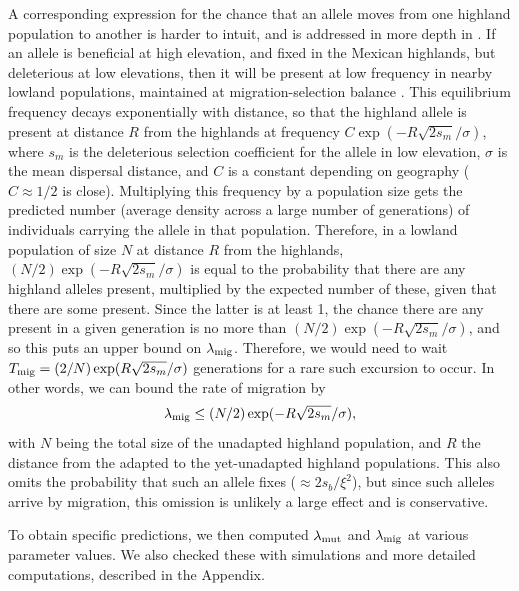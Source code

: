 A corresponding expression for the chance that an allele moves from one highland population to another is harder to intuit,
and is addressed in more depth in \citep{ralphcoop2013patches}.
If an allele is beneficial at high elevation, and fixed in the Mexican highlands,
but deleterious at low elevations,
then it will be present at low frequency in nearby lowland populations,
maintained at migration-selection balance \citep{slatkin1973geneflow}.
This equilibrium frequency decays exponentially with distance,
so that the highland allele is present at distance $R$ from the highlands at frequency $C \exp(- R \sqrt{2s_m} / \sigma)$,
where $s_m$ is the deleterious selection coefficient for the allele in low elevation,
$\sigma$ is the mean dispersal distance,
and $C$ is a constant depending on geography ($C\approx 1/2$ is close).
Multiplying this frequency by a population size gets the predicted number (average density across a large number of generations) of individuals carrying the allele in that population.
Therefore, in a lowland population of size $N$ at distance $R$ from the highlands,
$(N/2)  \exp(- R \sqrt{2s_m} / \sigma)$ is equal to the probability that there are any highland alleles present,
multiplied by the expected number of these, given that there are some present.
Since the latter is at least 1,
the chance there are any present in a given generation is no more than $(N/2) \exp(- R \sqrt{2s_m} / \sigma)$,
and so this puts an upper bound on $\lambda_{\text{mig}}$.
Therefore, we would need to wait $T_{\text{mig}} = (2/N)\exp(R \sqrt{2s_m} / \sigma)$ generations 
for a rare such excursion to occur.
In other words, we can bound the rate of migration by
\begin{align}
  \lambda_{\text{mig}} \le (N/2)  \exp(- R \sqrt{2s_m} / \sigma) ,
\end{align}
with $N$ being the total size of the unadapted highland population,
and $R$ the distance from the adapted to the yet-unadapted highland populations.
This also omits the probability that such an allele fixes ($\approx 2s_b/\xi^2$), 
but since such alleles arrive by migration, this omission is unlikely a large effect and is conservative.

To obtain specific predictions,
we then computed $\lambda_{\text{mut}}$ and $\lambda_{\text{mig}}$ at various parameter values.
We also checked these with simulations and more detailed computations,
described in the Appendix.




